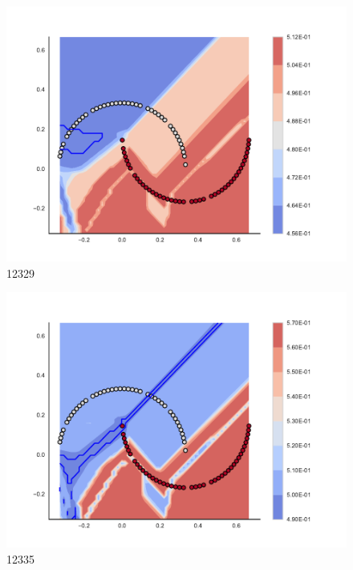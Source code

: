 \begin{subfigure}[b]{0.09\textwidth}
    \includegraphics[clip, trim=2.35cm 1.75cm 4.5cm 0cm,width=\textwidth]{img/convergence/12329.pdf}
    \caption{12329}
    \label{fig:convergence_12329}
\end{subfigure}
%
\begin{subfigure}[b]{0.09\textwidth}
    \includegraphics[clip, trim=2.35cm 1.75cm 4.5cm 0cm,width=\textwidth]{img/convergence/12335.pdf}
    \caption{12335}
    \label{fig:convergence_12335}
\end{subfigure}
%
